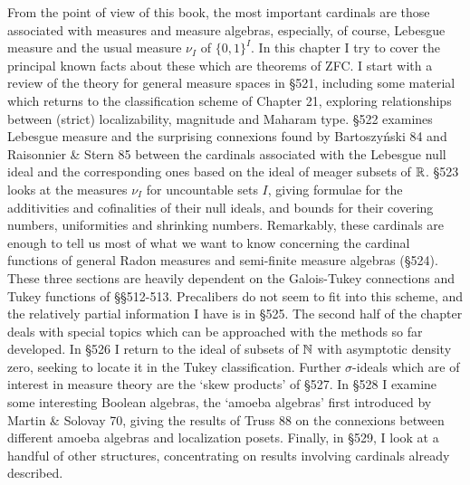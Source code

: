  
\def\chaptername{Cardinal functions of measure theory} 
 
 
From the point of view of this book, the most important cardinals are 
those associated with measures and measure algebras, especially, of 
course, Lebesgue measure and the usual measure $\nu_I$ of $\{0,1\}^I$. 
In this 
chapter I try to cover the principal known facts about these which are 
theorems of ZFC.   I start with a review of the theory for general measure 
spaces in \S521,  
including some material which returns to the classification 
scheme of Chapter 21, exploring relationships between (strict) 
localizability, magnitude and Maharam type.    
\S522 examines Lebesgue measure and the surprising 
connexions found by {\smc Bartoszy\'nski 84} and 
{\smc Raisonnier \& Stern 85} between the cardinals associated with the 
Lebesgue null 
ideal and the corresponding ones based on the ideal of meager subsets of 
$\Bbb R$.   \S523 looks at the 
measures $\nu_I$ for uncountable sets $I$, giving formulae for the 
additivities and cofinalities of their null ideals, and bounds for 
their covering numbers, uniformities and shrinking numbers.    
Remarkably, these cardinals 
are enough to tell us most of what we want to know concerning the 
cardinal functions of general Radon measures and semi-finite measure 
algebras (\S524).   These three sections are heavily dependent on the 
Galois-Tukey connections and Tukey functions of \S\S512-513.    
Precalibers do 
not seem to fit into this scheme, and the relatively partial information 
I have is in \S525.   The second half of the chapter deals with special 
topics which can be approached with the methods so far developed.    
In \S526 I return to the ideal of subsets of $\Bbb N$ 
with asymptotic density zero, seeking to locate it in the Tukey 
classification.   Further $\sigma$-ideals which are of interest in 
measure theory are the `skew products' of \S527.    
In \S528 I examine some interesting 
Boolean algebras, the `amoeba algebras' first introduced by 
{\smc Martin \& Solovay 70}, giving the results of {\smc Truss 88} 
on the connexions 
between different amoeba algebras and localization posets.   Finally, 
in \S529, I look at a handful of other structures, concentrating on 
results involving cardinals already described. 
 
\discrpage 
 
 
